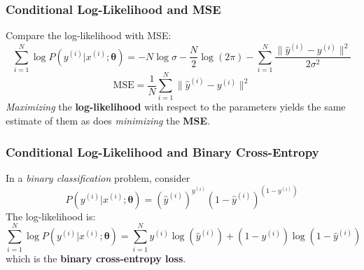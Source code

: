 \documentclass{beamer}
\begin{document}
		\begin{frame}
			\frametitle{Conditional Log-Likelihood and MSE}
			Compare the log-likelihood with MSE:
			$$\sum_{i=1}^{N}\log P(y^{(i)} | x^{(i)}; \bm{\theta}) = -N\log \sigma - \frac{N}{2}\log (2\pi) - \sum_{i=1}^{N}\frac{\|\hat{y}^{(i)}-y^{(i)}\|^2}{2\sigma^2}$$
			$$ \textrm{MSE} = \frac{1}{N}  \sum_{i=1}^{N}\|\hat{y}^{(i)}-y^{(i)}\|^2$$
			\textit{Maximizing} the \textbf{log-likelihood }with respect to the parameters yields the same estimate of them as does \textit{minimizing} the \textbf{MSE}.

		\end{frame}
		
			\begin{frame}
			\frametitle{Conditional Log-Likelihood and Binary Cross-Entropy}
			In a \textit{binary classification} problem, consider
			$$P(y^{(i)} | x^{(i)}; \bm{\theta}) = (\hat{y}^{(i)})^{y^{(i)}} (1-\hat{y}^{(i)})^{(1-{y}^{(i)})}$$
			The log-likelihood is:
			$$\sum_{i=1}^{N}\log P(y^{(i)} | x^{(i)}; \bm{\theta}) = \sum_{i=1}^{N}y^{(i)}\log(\hat{y}^{(i)}) + (1-{y}^{(i)})\log(1-\hat{y}^{(i)})$$
			which is the \textbf{binary cross-entropy loss}.
		\end{frame}
		
\end{document}
